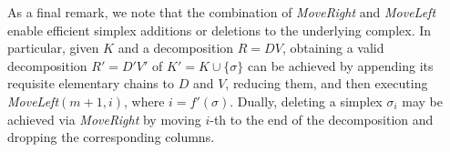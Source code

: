 \documentclass[sn-mathphys]{sn-jnl}
\begin{document}
As a final remark, we note that the combination of \emph{MoveRight} and \emph{MoveLeft} enable efficient simplex additions or deletions to the underlying complex. In particular, given $K$ and a decomposition $R = DV$, obtaining a valid decomposition $R' = D' V'$ of $K' = K \cup \{\sigma\}$ can be achieved by appending its requisite elementary chains to $D$ and $V$, reducing them, and then executing \emph{MoveLeft}$(m+1, i)$, where $i = f'(\sigma)$. Dually, deleting a simplex $\sigma_i$ may be achieved via \emph{MoveRight} by moving $i$-th to the end of the decomposition and dropping the corresponding columns. 

\end{document}
